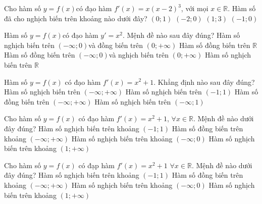 \begin{ex}%
	Cho hàm số $y=f(x)$có đạo hàm $f'(x)=x{\left(x-2\right)^3}$, với mọi $x\in \mathbb{R}$. Hàm số đã cho nghịch biến trên khoảng nào dưới đây?
	\choice
	{\True $\left(0; 1\right)$}
	{$\left(-2; 0\right)$}
	{$\left(1; 3\right)$}
	{$\left(-1; 0\right)$}
\end{ex}

\begin{ex}%
	Hàm số $y=f(x)$có đạo hàm $y'=x^2$. Mệnh đề nào sau đây đúng?
	\choice
	{Hàm số nghịch biến trên $\left(-\infty; 0\right)$và đồng biến trên $\left(0; +\infty\right)$}
	{\True Hàm số đồng biến trên $\mathbb{R}$}
	{Hàm số đồng biến trên $\left(-\infty; 0\right)$và nghịch biến trên $\left(0; +\infty\right)$}
	{Hàm số nghịch biến trên $\mathbb{R}$}
\end{ex}

\begin{ex}%
	Hàm số $y=f(x)$ có đạo hàm $f'(x)=x^2+1$. Khẳng định nào sau đây đúng?
	\choice
	{Hàm số nghịch biến trên $(-\infty; +\infty)$}
	{Hàm số nghịch biến trên $(-1; 1)$}
	{\True Hàm số đồng biến trên $(-\infty; +\infty)$}
	{Hàm số nghịch biến trên $(-\infty; 1)$}
\end{ex}

\begin{ex}%
	Cho hàm số $y=f(x)$ có đạo hàm $f'(x)=x^2+1$, $\forall x\in \mathbb{R}$. Mệnh đề nào dưới đây đúng?
	\choice
	{Hàm số nghịch biến trên khoảng $\left(-1; 1\right)$}
	{\True Hàm số đồng biến trên khoảng $\left(-\infty; +\infty\right)$}
	{Hàm số nghịch biến trên khoảng $\left(-\infty; 0\right)$}
	{Hàm số nghịch biến trên khoảng $\left(1; +\infty\right)$}
\end{ex}

\begin{ex}%
	Cho hàm số $y=f(x)$ có đạp hàm $f'(x)=x^2+1\,\, \forall x\in \mathbb{R}$. Mệnh đề nào dưới đây đúng?
	\choice
	{Hàm số nghịch biến trên khoảng $\left(-1; 1\right)$}
	{\True Hàm số đồng biến trên khoảng $\left(-\infty; +\infty\right)$}
	{Hàm số nghịch biến trên khoảng $\left(-\infty; 0\right)$}
	{Hàm số nghịch biến trên khoảng $\left(1; +\infty \right)$}
\end{ex}

